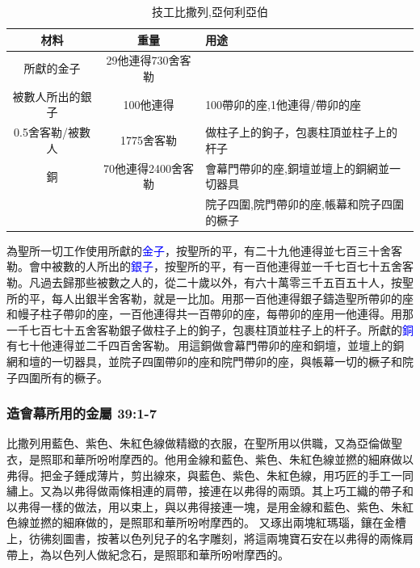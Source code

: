 \begin{table}
\begin{table}
\vspace*{-\baselineskip}
\center
\begin{tabular}{ c c l }
\toprule
材料 &重量 &用途\\\hline
所獻的金子&29他連得730舍客勒 &  \\\hline
被數人所出的銀子&100他連得 &100帶卯的座,1他連得/帶卯的座\\
0.5舍客勒/被數人 &1775舍客勒&做柱子上的鉤子，包裹柱頂並柱子上的杆子\\\hline
銅 &70他連得2400舍客勒&會幕門帶卯的座,銅壇並壇上的銅網並一切器具\\
   &                               &院子四圍,院門帶卯的座,帳幕和院子四圍的橛子\\\hline
\end{tabular}
\caption{技工比撒列,亞何利亞伯}
\end{table}
為聖所一切工作使用所獻的\textcolor{blue}{金子}，按聖所的平，有二十九他連得並七百三十舍客勒。會中被數的人所出的\textcolor{blue}{銀子}，按聖所的平，有一百他連得並一千七百七十五舍客勒。凡過去歸那些被數之人的，從二十歲以外，有六十萬零三千五百五十人，按聖所的平，每人出銀半舍客勒，就是一比加。用那一百他連得銀子鑄造聖所帶卯的座和幔子柱子帶卯的座，一百他連得共一百帶卯的座，每帶卯的座用一他連得。用那一千七百七十五舍客勒銀子做柱子上的鉤子，包裹柱頂並柱子上的杆子。所獻的\textcolor{blue}{銅}有七十他連得並二千四百舍客勒。 用這銅做會幕門帶卯的座和銅壇，並壇上的銅網和壇的一切器具，並院子四圍帶卯的座和院門帶卯的座，與帳幕一切的橛子和院子四圍所有的橛子。

\subsubsection{造會幕所用的金屬 39:1-7}
比撒列用藍色、紫色、朱紅色線做精緻的衣服，在聖所用以供職，又為亞倫做聖衣，是照耶和華所吩咐摩西的。他用金線和藍色、紫色、朱紅色線並撚的細麻做以弗得。把金子錘成薄片，剪出線來，與藍色、紫色、朱紅色線，用巧匠的手工一同繡上。又為以弗得做兩條相連的肩帶，接連在以弗得的兩頭。其上巧工織的帶子和以弗得一樣的做法，用以束上，與以弗得接連一塊，是用金線和藍色、紫色、朱紅色線並撚的細麻做的，是照耶和華所吩咐摩西的。
又琢出兩塊紅瑪瑙，鑲在金槽上，彷彿刻圖書，按著以色列兒子的名字雕刻，將這兩塊寶石安在以弗得的兩條肩帶上，為以色列人做紀念石，是照耶和華所吩咐摩西的。


\end{table}
